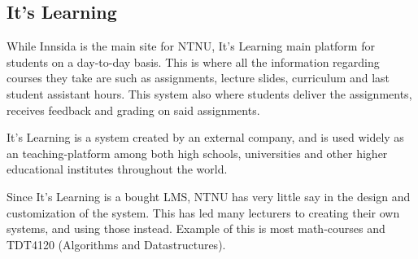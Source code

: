 \subsection{It's Learning}
While Innsida is the main site for NTNU, It’s Learning main platform for students on a day-to-day basis. This is where all the information regarding courses they take are such as assignments, lecture slides, curriculum and last student assistant hours. This system also  where students deliver the assignments, receives feedback and grading on said assignments. 

It’s Learning is a system created by an external company, and is used widely as an teaching-platform among both high schools, universities and other higher educational institutes throughout the world. 

Since It’s Learning is a bought LMS, NTNU has very little say in the design and customization of the system. This has led many lecturers to creating their own systems, and using those instead. Example of this is most math-courses and TDT4120 (Algorithms and Datastructures).